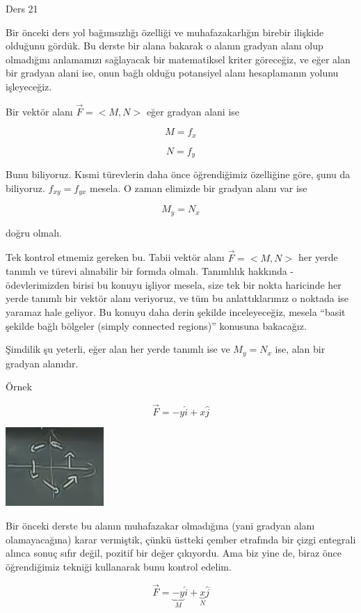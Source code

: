 \documentclass[12pt,fleqn]{article}\usepackage{../../common}
\begin{document}
Ders 21

Bir önceki ders yol bağımsızlığı özelliği ve muhafazakarlığın birebir ilişkide
olduğunu gördük. Bu derste bir alana bakarak o alanın gradyan alanı olup
olmadığını anlamamızı sağlayacak bir matematiksel kriter göreceğiz, ve eğer alan
bir gradyan alani ise, onun bağlı olduğu potansiyel alanı hesaplamanın yolunu
işleyeceğiz.

Bir vektör alanı $\vec{F} = <M,N>$ eğer gradyan alani ise 

$$ M = f_x $$

$$ N = f_y $$

Bunu biliyoruz. Kısmi türevlerin daha önce öğrendiğimiz özelliğine göre, şunu da
biliyoruz. $f_{xy} = f_{yx}$ mesela. O zaman elimizde bir gradyan alanı var ise

$$ M_y = N_x $$

doğru olmalı. 

Tek kontrol etmemiz gereken bu. Tabii vektör alanı $\vec{F} = <M,N>$ her yerde
tanımlı ve türevi alınabilir bir formda olmalı. Tanımlılık hakkında -
ödevlerimizden birisi bu konuyu işliyor mesela, size tek bir nokta haricinde her
yerde tanımlı bir vektör alanı veriyoruz, ve tüm bu anlattıklarımız o noktada
ise yaramaz hale geliyor. Bu konuyu daha derin şekilde inceleyeceğiz, mesela
``basit şekilde bağlı bölgeler (simply connected regions)'' konusuna bakacağız.

Şimdilik şu yeterli, eğer alan her yerde tanımlı ise ve $M_y = N_x$ ise,
alan bir gradyan alanıdır. 

Örnek 

$$ \vec{F} = -y\hat{i} + x\hat{j} $$
\begin{center}
\includegraphics[height=3cm]{21_1.png}
\end{center}
Bir önceki derste bu alanın muhafazakar olmadığına (yani gradyan alanı
olamayacağına) karar vermiştik, çünkü üstteki çember etrafında bir çizgi
entegrali alınca sonuç sıfır değil, pozitif bir değer çıkıyordu. Ama biz yine
de, biraz önce öğrendiğimiz tekniği kullanarak bunu kontrol edelim.

$$ \vec{F} = \underbrace{-y}_{M}\hat{i} + 
\underbrace{x}_{N}\hat{j} 
$$
\end{document}
